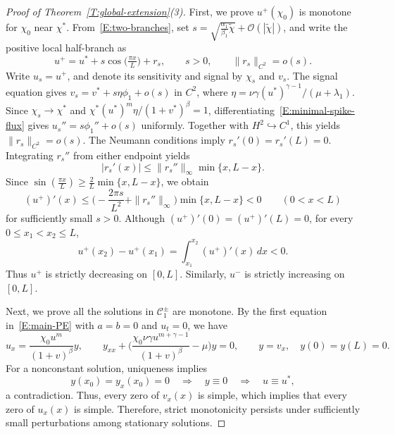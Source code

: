 \documentclass[11pt]{article} %
\theoremstyle{remark}
\theoremstyle{remark}
\numberwithin{equation}{section}
\numberwithin{figure}{section}
\numberwithin{table}{section}
\begin{document}
\begin{proof}[Proof of Theorem~\ref{T:global-extension}(3)]
  First, we prove $u^+(\chi_0)$ is monotone for $\chi_0$ near $\chi^*$.
  From~\eqref{E:two-branches}, set $s =
  \sqrt{\frac{\alpha_1}{\beta_1}\tilde{\chi}} + \mathcal{O}(|\tilde{\chi}|)$,
  and write the positive local half-branch as
  \[
    u^+=u^*+s\cos\big(\tfrac{\pi x}{L}\big)+r_s,
    \qquad s>0,\qquad \|r_s\|_{C^2}=o(s).
  \]
  Write $u_s = u^+$, and denote its sensitivity and signal by $\chi_s$ and
  $v_s$. The signal equation gives $v_s = v^* + s\eta\phi_1 + o(s)$ in $C^2$,
  where $\eta = \nu\gamma(u^*)^{\gamma-1}/(\mu + \lambda_1)$. Since $\chi_s \to
  \chi^*$ and $\chi^*{(u^*)^m}\eta/(1 + v^*)^\beta = 1$,
  differentiating~\eqref{E:minimal-spike-flux} gives $u_s'' = s\phi_1'' + o(s)$
  uniformly. Together with $H^2\hookrightarrow C^1$, this yields $\|r_s\|_{C^2}
  = o(s)$. The Neumann conditions imply $r_s'(0) = r_s'(L) = 0$. Integrating
  $r_s''$ from either endpoint yields
  \[
    |r_s'(x)|
    \le\|r_s''\|_\infty\min\{x,L-x\}.
  \]
  Since $\sin\left(\frac{\pi x}{L}\right) \ge \frac{2}{L}\min\{x,L - x\}$, we
  obtain
  \[
    (u^+)'(x)
    \le\Big(
    -\frac{2\pi s}{L^2}+\|r_s''\|_\infty
    \Big)\min\{x,L-x\}<0
    \qquad(0<x<L)
  \]
  for sufficiently small $s > 0$. Although $(u^+)'(0) = (u^+)'(L) = 0$, for
  every $0 \le x_1 < x_2 \le L$,
  \[
    u^+(x_2)-u^+(x_1)
    =\int_{x_1}^{x_2}(u^+)'(x)\,dx<0.
  \]
  Thus $u^+$ is strictly decreasing on $[0, L]$. Similarly, $u^-$ is strictly
  increasing on $[0, L]$.

  Next, we prove all the solutions in $\mathcal{C}_1^\pm$ are monotone. By the
  first equation in~\eqref{E:main-PE} with $a = b = 0$ and $u_t = 0$, we have
  \begin{equation}\label{E:y-eq}
    u_x=\frac{\chi_0u^{m}}{(1+v)^\beta}y,
    \qquad
    y_{xx}
    +\Big(
    \frac{\chi_0\nu\gamma u^{m+\gamma-1}}{(1+v)^\beta}-\mu
    \Big)y=0,
    \qquad y=v_x,\quad y(0)=y(L)=0.
  \end{equation}
  For a nonconstant solution, uniqueness implies
  \[
    y(x_0)=y_x(x_0)=0
    \quad\Longrightarrow\quad
    y\equiv0
    \quad\Longrightarrow\quad
    u\equiv u^*,
  \]
  a contradiction. Thus, every zero of $v_x(x)$ is simple, which implies that
  every zero of $u_x(x)$ is simple. Therefore, strict monotonicity persists
  under sufficiently small perturbations among stationary solutions.



\end{proof}
\end{document}
